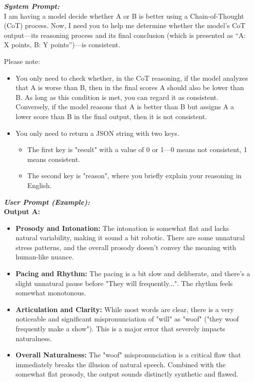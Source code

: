\documentclass[]{bytedance_seed}
\begin{document}
\begin{promptbox}

\textit{\textbf{System Prompt:} }\\
I am having a model decide whether A or B is better using a Chain-of-Thought (CoT) process. Now, I need you to help me determine whether the model’s CoT output—its reasoning process and its final conclusion (which is presented as “A: X points, B: Y points”)—is consistent.

Please note:
\begin{itemize}[itemsep=0ex,leftmargin=3ex]
    \item You only need to check whether, in the CoT reasoning, if the model analyzes that A is worse than B, then in the final scores A should also be lower than B. As long as this condition is met, you can regard it as consistent. Conversely, if the model reasons that A is better than B but assigns A a lower score than B in the final output, then it is not consistent.
    \item You only need to return a JSON string with two keys.
    \begin{itemize}[itemsep=0ex,leftmargin=3ex,label=$\circ$]
        \item The first key is "result" with a value of 0 or 1—0 means not consistent, 1 means consistent.
        \item The second key is "reason", where you briefly explain your reasoning in English.
    \end{itemize}
\end{itemize}


\medskip \textit{\textbf{User Prompt (Example):} }\\

\textbf{Output A:}
\begin{itemize}[itemsep=0ex,leftmargin=3ex]
    \item \textbf{Prosody and Intonation:} The intonation is somewhat flat and lacks natural variability, making it sound a bit robotic. There are some unnatural stress patterns, and the overall prosody doesn't convey the meaning with human-like nuance.
    \item \textbf{Pacing and Rhythm:} The pacing is a bit slow and deliberate, and there's a slight unnatural pause before "They will frequently...". The rhythm feels somewhat monotonous.
    \item \textbf{Articulation and Clarity:} While most words are clear, there is a very noticeable and significant mispronunciation of "will" as "woof" ("they woof frequently make a show"). This is a major error that severely impacts naturalness.
    \item \textbf{Overall Naturalness:} The "woof" mispronunciation is a critical flaw that immediately breaks the illusion of natural speech. Combined with the somewhat flat prosody, the output sounds distinctly synthetic and flawed.
\end{itemize}


\end{promptbox}
\end{document}
